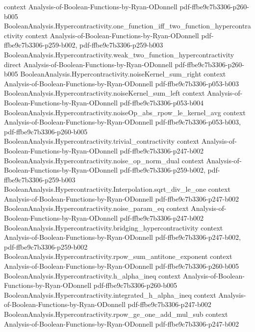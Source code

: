 \begin{lemma}
  {context}
  {Analysis-of-Boolean-Functions-by-Ryan-ODonnell}
  {pdf-ffbe9c7b3306-p260-b005}
\proofstep
  {BooleanAnalysis.Hypercontractivity.one_function_iff_two_function_hypercontractivity}
  {context}
  {Analysis-of-Boolean-Functions-by-Ryan-ODonnell}
  {pdf-ffbe9c7b3306-p259-b002,
    pdf-ffbe9c7b3306-p259-b003}
\proofstep
  {BooleanAnalysis.Hypercontractivity.weak_two_function_hypercontractivity}
  {direct}
  {Analysis-of-Boolean-Functions-by-Ryan-ODonnell}
  {pdf-ffbe9c7b3306-p260-b005}
\proofstep
  {BooleanAnalysis.Hypercontractivity.noiseKernel_sum_right}
  {context}
  {Analysis-of-Boolean-Functions-by-Ryan-ODonnell}
  {pdf-ffbe9c7b3306-p053-b003}
\proofstep
  {BooleanAnalysis.Hypercontractivity.noiseKernel_sum_left}
  {context}
  {Analysis-of-Boolean-Functions-by-Ryan-ODonnell}
  {pdf-ffbe9c7b3306-p053-b004}
\proofstep
  {BooleanAnalysis.Hypercontractivity.noiseOp_abs_rpow_le_kernel_avg}
  {context}
  {Analysis-of-Boolean-Functions-by-Ryan-ODonnell}
  {pdf-ffbe9c7b3306-p053-b003,
    pdf-ffbe9c7b3306-p260-b005}
\proofstep
  {BooleanAnalysis.Hypercontractivity.trivial_contractivity}
  {context}
  {Analysis-of-Boolean-Functions-by-Ryan-ODonnell}
  {pdf-ffbe9c7b3306-p247-b002}
\proofstep
  {BooleanAnalysis.Hypercontractivity.noise_op_norm_dual}
  {context}
  {Analysis-of-Boolean-Functions-by-Ryan-ODonnell}
  {pdf-ffbe9c7b3306-p259-b002,
    pdf-ffbe9c7b3306-p259-b003}
\proofstep
  {BooleanAnalysis.Hypercontractivity.Interpolation.sqrt_div_le_one}
  {context}
  {Analysis-of-Boolean-Functions-by-Ryan-ODonnell}
  {pdf-ffbe9c7b3306-p247-b002}
\proofstep
  {BooleanAnalysis.Hypercontractivity.noise_param_eq}
  {context}
  {Analysis-of-Boolean-Functions-by-Ryan-ODonnell}
  {pdf-ffbe9c7b3306-p247-b002}
\proofstep
  {BooleanAnalysis.Hypercontractivity.bridging_hypercontractivity}
  {context}
  {Analysis-of-Boolean-Functions-by-Ryan-ODonnell}
  {pdf-ffbe9c7b3306-p247-b002,
    pdf-ffbe9c7b3306-p259-b002}
\proofstep
  {BooleanAnalysis.Hypercontractivity.rpow_sum_antitone_exponent}
  {context}
  {Analysis-of-Boolean-Functions-by-Ryan-ODonnell}
  {pdf-ffbe9c7b3306-p260-b005}
\proofstep
  {BooleanAnalysis.Hypercontractivity.h_alpha_ineq}
  {context}
  {Analysis-of-Boolean-Functions-by-Ryan-ODonnell}
  {pdf-ffbe9c7b3306-p260-b005}
\proofstep
  {BooleanAnalysis.Hypercontractivity.integrated_h_alpha_ineq}
  {context}
  {Analysis-of-Boolean-Functions-by-Ryan-ODonnell}
  {pdf-ffbe9c7b3306-p247-b002}
\proofstep
  {BooleanAnalysis.Hypercontractivity.rpow_ge_one_add_mul_sub}
  {context}
  {Analysis-of-Boolean-Functions-by-Ryan-ODonnell}
  {pdf-ffbe9c7b3306-p247-b002}
\proofstep

\end{lemma}
